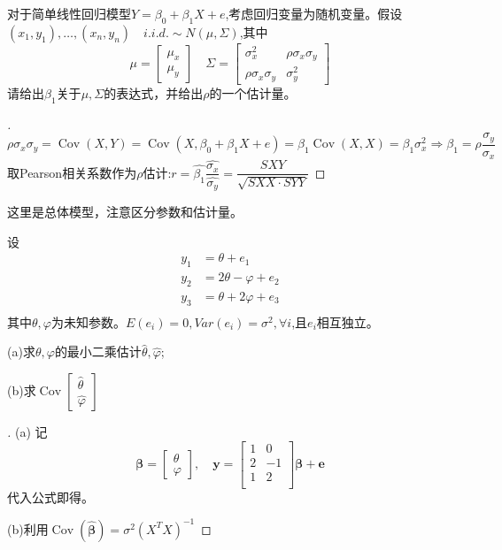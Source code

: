 \documentclass[cn,hazy,green,12pt,normal]{elegantnote}
\DeclareMathOperator{\Cov}{Cov}
\numberwithin{equation}{section}
\numberwithin{subsection}{section}
\begin{document}
\begin{homework}
    对于简单线性回归模型$Y=\beta_0+\beta_1X+e$,考虑回归变量为随机变量。假设$(x_1,y_1),\dots,(x_n,y_n)\quad i.i.d. \sim N(\mu, \Sigma)$,其中
    \[
    \mu=\begin{bmatrix}
        \mu_x\\
        \mu_y
    \end{bmatrix}
    \quad
    \Sigma=\begin{bmatrix}
        \sigma_x^2 & \rho\sigma_x\sigma_y\\
        \rho\sigma_x\sigma_y & \sigma_y^2
    \end{bmatrix}
    \]
    请给出$\beta_1$关于$\mu,\Sigma$的表达式，并给出$\rho $的一个估计量。
\end{homework}
\begin{proof}[\solutionname]
\[
    \rho\sigma_x\sigma_y=\Cov(X,Y)=\Cov(X,\beta_0+\beta_1X+e)=\beta_1\Cov(X,X)=\beta_1\sigma_x^2 \Rightarrow \beta_1=\rho\frac{\sigma_y}{\sigma_x}
    \]
    取Pearson相关系数作为$\rho$估计:$r=\hat{\beta_1}\dfrac{\hat{\sigma_x}}{\hat{\sigma_y}}=\dfrac{SXY}{\sqrt{SXX\cdot SYY}}$
\end{proof}
\begin{note}
    这里是总体模型，注意区分参数和估计量。
\end{note}
\begin{homework}
    设
    \[
    \begin{aligned}
    y_1&=\theta+e_1\\
    y_2&=2\theta-\varphi +e_2\\
    y_3&=\theta+2\varphi +e_3\\
    \end{aligned}
    \]
    其中$\theta,\varphi$为未知参数。$E(e_i)=0,Var(e_i)=\sigma^2,\forall i$,且$e_i$相互独立。

    (a)求$\theta,\varphi$的最小二乘估计$\hat{\theta},\hat{\varphi}$;

    (b)求$\Cov\begin{bmatrix}
        \hat{\theta}\\
        \hat{\varphi}
    \end{bmatrix}$
\end{homework}
\begin{proof}[\solutionname]
   (a) 记\[
    \bm \beta = \begin{bmatrix}
        \theta\\
        \varphi
    \end{bmatrix},\quad \bm y = \begin{bmatrix}
        1&0\\
        2&-1\\
        1&2\\
    \end{bmatrix}\bm \beta +\bm e
    \]
    代入公式即得。

    (b)利用$\Cov(\bm \hat{\beta})=\sigma^2(X^TX)^{-1}$
\end{proof}
\end{document}
